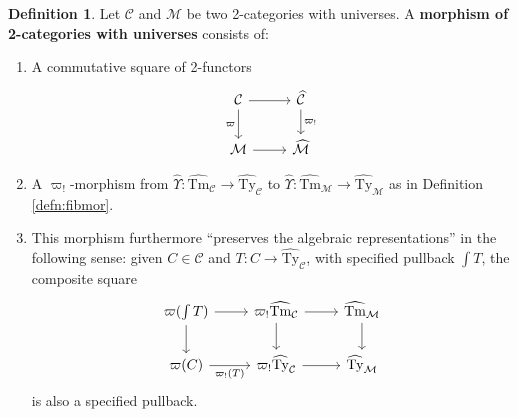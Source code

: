 \documentclass[10pt]{article}
\theoremstyle{definition}
\newtheorem{definition}{Definition}
\newcommand\M{\mathcal{M}}
\newcommand\Mhat{\widehat{\mathcal{M}}}
\newcommand\Mtyhat{{\widehat{\mathrm{Ty}}_{\M}}}
\newcommand\Mtmhat{{\widehat{\mathrm{Tm}}_{\M}}}
\newcommand\Upshat{{\widehat{\Upsilon}}}
\newcommand\C{\mathcal{C}}
\newcommand\Chat{{\widehat{\mathcal{C}}}}
\newcommand\Ctyhat{{\widehat{\mathrm{Ty}}}_{\C}}
\newcommand\Ctmhat{{\widehat{\mathrm{Tm}}}_{\C}}
\newcommand\vp{\varpi}
\newcommand\vpst{\vp^*}
\newcommand\vpsh{\vp_!}
\newcommand\vpty{{\vp}_{\mathrm{Ty}}}
\newcommand\vptm{{\vp}_{\mathrm{Tm}}}
\begin{document}
\begin{definition}\label{defn:mor-2cwu}
  Let $\C$ and $\M$ be two 2-categories with universes.
  A \textbf{morphism of 2-categories with universes} consists of:
  \begin{enumerate}
  \item A commutative square of 2-functors
    \begin{equation}\label{eq:mor-2cwu}
      \begin{tikzcd}
        \C \ar[r] \ar[d,"\vp"'] & \Chat \ar[d,"\vpsh"] \\
        \M \ar[r] & \Mhat
      \end{tikzcd}
    \end{equation}
  \item A $\vpsh$-morphism from $\Upshat:\Ctmhat \to \Ctyhat$ to $\Upshat : \Mtmhat \to \Mtyhat$ as in Definition \ref{defn:fibmor}.
  \item This morphism furthermore ``preserves the algebraic representations'' in the following sense: given $C\in \C$ and $T:C \to \Ctyhat$, with specified pullback $\int T$, the composite square
    \begin{equation}
      \begin{tikzcd}
        \vp(\int T) \ar[r] \ar[d] & \vpsh \Ctmhat \ar[r] \ar[d] & \Mtmhat \ar[d]\\
        \vp(C) \ar[r,"\vpsh(T)"'] & \vpsh \Ctyhat \ar[r] & \Mtyhat
      \end{tikzcd}\label{eq:mor-presrep}
    \end{equation}
    is also a specified pullback.

\end{enumerate}
\end{definition}
\end{document}
